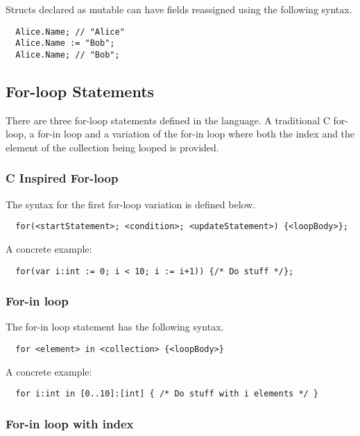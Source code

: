 Structs declared as mutable can have fields reassigned using the following syntax.

\begin{verbatim}
  Alice.Name; // "Alice"
  Alice.Name := "Bob";
  Alice.Name; // "Bob";
\end{verbatim}

\subsection{For-loop Statements}
\label{sec:forLoopStatements}

There are three for-loop statements defined in the language. A traditional C for-loop, a for-in loop and a variation of the for-in loop where both the index and the element of the collection being looped is provided.

\subsubsection{C Inspired For-loop}
\label{sec:cForLoop}

The syntax for the first for-loop variation is defined below.

\begin{verbatim}
  for(<startStatement>; <condition>; <updateStatement>) {<loopBody>};
\end{verbatim}

A concrete example:

\begin{verbatim}
  for(var i:int := 0; i < 10; i := i+1)) {/* Do stuff */};
\end{verbatim}

\subsubsection{For-in loop}
\label{sec:forInLoop}

The for-in loop statement has the following syntax.

\begin{verbatim}
  for <element> in <collection> {<loopBody>}
\end{verbatim}

A concrete example:

\begin{verbatim}
  for i:int in [0..10]:[int] { /* Do stuff with i elements */ }
\end{verbatim}

\subsubsection{For-in loop with index}
\label{sec:forInLoopIndex}

